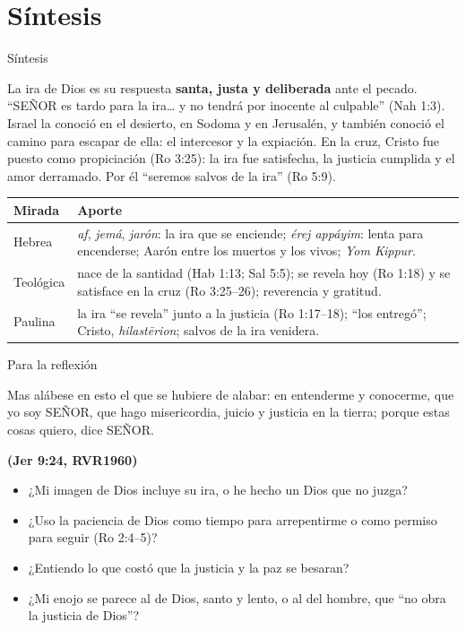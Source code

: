 \documentclass[hyperref={bookmarks=false},aspectratio=169]{beamer}
\newcommand{\SENOR}{S{\fontsize{0.78em}{1em}\selectfont EÑOR}}
\newcommand{\fuente}[1]{\par\hfill{\upshape\bfseries\footnotesize\textcolor{azul}{#1}}}
\newcommand{\destacar}[1]{\textbf{\textcolor{azul}{#1}}}
\begin{document}
\section{Síntesis}

\begin{frame}{Síntesis}
\begin{tcolorbox}[colback=papiro,colframe=azul,boxrule=1pt,arc=3pt]
\small La ira de Dios es su respuesta \destacar{santa, justa y deliberada} ante el pecado. ``\SENOR{} es tardo para la ira\ldots{} y no tendrá por inocente al culpable'' (Nah 1:3). Israel la conoció en el desierto, en Sodoma y en Jerusalén, y también conoció el camino para escapar de ella: el intercesor y la expiación. En la cruz, Cristo fue puesto como propiciación (Ro 3:25): la ira fue satisfecha, la justicia cumplida y el amor derramado. Por él ``seremos salvos de la ira'' (Ro 5:9).
\end{tcolorbox}
\scriptsize\renewcommand{\arraystretch}{1.2}
\begin{tabular}{@{}>{\RaggedRight\arraybackslash}p{2.4cm}>{\RaggedRight\arraybackslash}p{9.4cm}@{}}
\toprule
\textbf{Mirada} & \textbf{Aporte} \\ \midrule
Hebrea & \emph{af}, \emph{jemá}, \emph{jarón}: la ira que se enciende; \emph{érej appáyim}: lenta para encenderse; Aarón entre los muertos y los vivos; \emph{Yom Kippur}. \\
Teológica & nace de la santidad (Hab 1:13; Sal 5:5); se revela hoy (Ro 1:18) y se satisface en la cruz (Ro 3:25--26); reverencia y gratitud. \\
Paulina & la ira ``se revela'' junto a la justicia (Ro 1:17--18); ``los entregó''; Cristo, \emph{hilastērion}; salvos de la ira venidera. \\
\bottomrule
\end{tabular}
\end{frame}

\begin{frame}{Para la reflexión}
\begin{cita}Mas alábese en esto el que se hubiere de alabar: en entenderme y conocerme, que yo soy \SENOR, que hago misericordia, juicio y justicia en la tierra; porque estas cosas quiero, dice \SENOR.\fuente{(Jer 9:24, RVR1960)}\end{cita}
\small
\begin{itemize}
\item ¿Mi imagen de Dios incluye su ira, o he hecho un Dios que no juzga?
\item ¿Uso la paciencia de Dios como tiempo para arrepentirme o como permiso para seguir (Ro 2:4--5)?
\item ¿Entiendo lo que costó que la justicia y la paz se besaran?
\item ¿Mi enojo se parece al de Dios, santo y lento, o al del hombre, que ``no obra la justicia de Dios''?
\end{itemize}
\end{frame}
\end{document}
